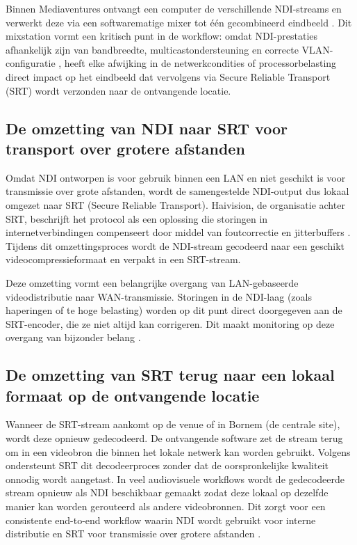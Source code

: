 Binnen Mediaventures ontvangt een computer de verschillende NDI-streams en verwerkt deze via een softwarematige mixer tot één gecombineerd eindbeeld \autocite{VanRenterghem2025}. Dit mixstation vormt een kritisch punt in de workflow: omdat NDI-prestaties afhankelijk zijn van bandbreedte, multicastondersteuning en correcte VLAN-configuratie \autocite{NewTek2022}, heeft elke afwijking in de netwerkcondities of processorbelasting direct impact op het eindbeeld dat vervolgens via Secure Reliable Transport (SRT) wordt verzonden naar de ontvangende locatie.

\subsection{De omzetting van NDI naar SRT voor transport over grotere afstanden}

Omdat NDI ontworpen is voor gebruik binnen een LAN en niet geschikt is voor transmissie over grote afstanden, wordt de samengestelde NDI-output dus lokaal omgezet naar SRT (Secure Reliable Transport). Haivision, de organisatie achter SRT, beschrijft het protocol als een oplossing die storingen in internetverbindingen compenseert door middel van foutcorrectie en jitterbuffers \autocite{Haivision2023}. Tijdens dit omzettingsproces wordt de NDI-stream gecodeerd naar een geschikt videocompressieformaat en verpakt in een SRT-stream.

Deze omzetting vormt een belangrijke overgang van LAN-gebaseerde videodistributie naar WAN-transmissie. Storingen in de NDI-laag (zoals haperingen of te hoge belasting) worden op dit punt direct doorgegeven aan de SRT-encoder, die ze niet altijd kan corrigeren. Dit maakt monitoring op deze overgang van bijzonder belang \autocite{VanRenterghem2025}.

\subsection{De omzetting van SRT terug naar een lokaal formaat op de ontvangende locatie}

Wanneer de SRT-stream aankomt op de venue of in Bornem (de centrale site), wordt deze opnieuw gedecodeerd. De ontvangende software zet de stream terug om in een videobron die binnen het lokale netwerk kan worden gebruikt. Volgens \textcite{Haivision2023} ondersteunt SRT dit decodeerproces zonder dat de oorspronkelijke kwaliteit onnodig wordt aangetast. In veel audiovisuele workflows wordt de gedecodeerde stream opnieuw als NDI beschikbaar gemaakt zodat deze lokaal op dezelfde manier kan worden gerouteerd als andere videobronnen. Dit zorgt voor een consistente end-to-end workflow waarin NDI wordt gebruikt voor interne distributie en SRT voor transmissie over grotere afstanden \autocite{VanRenterghem2025}.

